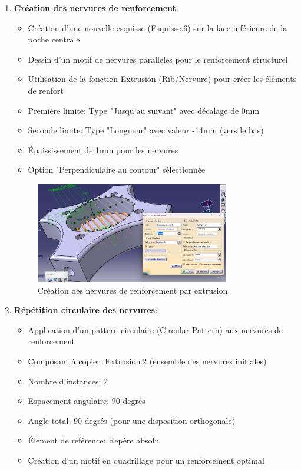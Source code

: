 \documentclass[a4paper,12pt]{report}
\begin{document}
\begin{enumerate}
    \item \textbf{Création des nervures de renforcement}:
    \begin{itemize}
        \item Création d'une nouvelle esquisse (Esquisse.6) sur la face inférieure de la poche centrale
        \item Dessin d'un motif de nervures parallèles pour le renforcement structurel
        \item Utilisation de la fonction Extrusion (Rib/Nervure) pour créer les éléments de renfort
        \item Première limite: Type "Jusqu'au suivant" avec décalage de 0mm
        \item Seconde limite: Type "Longueur" avec valeur -14mm (vers le bas)
        \item Épaississement de 1mm pour les nervures
        \item Option "Perpendiculaire au contour" sélectionnée
    \end{itemize}
    
    \begin{figure}[H]
        \centering
        \includegraphics[width=0.8\textwidth]{images/nervures_renforcement.png}
        \caption{Création des nervures de renforcement par extrusion}
        \label{fig:nervures_renforcement}
    \end{figure}
    
    \item \textbf{Répétition circulaire des nervures}:
    \begin{itemize}
        \item Application d'un pattern circulaire (Circular Pattern) aux nervures de renforcement
        \item Composant à copier: Extrusion.2 (ensemble des nervures initiales)
        \item Nombre d'instances: 2
        \item Espacement angulaire: 90 degrés
        \item Angle total: 90 degrés (pour une disposition orthogonale)
        \item Élément de référence: Repère absolu\Axe
        \item Création d'un motif en quadrillage pour un renforcement optimal
    \end{itemize}
    

\end{enumerate}
\end{document}
